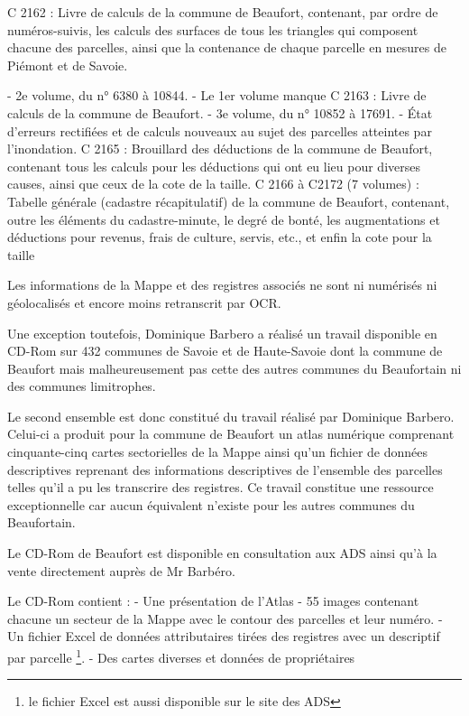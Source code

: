 \documentclass[12pt,a4paper]{report}
\begin{document}
C 2162 : Livre de calculs de la commune de Beaufort, contenant, par ordre de numéros-suivis, les calculs des surfaces de tous les triangles qui composent chacune des parcelles, ainsi que la contenance de chaque parcelle en mesures de Piémont et de Savoie.

- 2e volume, du n° 6380 à 10844. - Le 1er volume manque
C 2163 : Livre de calculs de la commune de Beaufort. - 3e volume, du n° 10852 à 17691. - État d’erreurs rectifiées et de calculs nouveaux au sujet des parcelles atteintes par l’inondation.
C 2165 : Brouillard des déductions de la commune de Beaufort, contenant tous les calculs pour les déductions qui ont eu lieu pour diverses causes, ainsi que ceux de la cote de la taille.
C 2166 à C2172 (7 volumes) : Tabelle générale (cadastre récapitulatif) de la commune de Beaufort, contenant, outre les éléments du cadastre-minute, le degré de bonté, les augmentations et déductions pour revenus, frais de culture, servis, etc., et enfin la cote pour la taille

\medskip

Les informations de la Mappe et des registres associés ne sont ni numérisés ni géolocalisés et encore moins retranscrit par OCR.

Une exception toutefois, Dominique Barbero  a réalisé un travail disponible en CD-Rom sur 432 communes de Savoie et de Haute-Savoie dont la commune de Beaufort mais malheureusement pas cette des autres communes du Beaufortain ni des communes limitrophes.

Le second ensemble est donc constitué du travail réalisé par Dominique Barbero. Celui-ci a produit pour la commune de Beaufort un atlas numérique comprenant cinquante-cinq cartes sectorielles de la Mappe ainsi qu'un fichier de données descriptives reprenant des informations descriptives de l'ensemble des parcelles telles qu'il a pu les transcrire des registres. Ce travail constitue une ressource exceptionnelle car aucun équivalent n'existe pour les autres communes du Beaufortain.

Le CD-Rom de Beaufort est disponible en consultation aux ADS ainsi qu’à la vente directement auprès de Mr Barbéro.

Le CD-Rom contient : 
-	Une présentation de l’Atlas
-	55 images contenant chacune un secteur de la Mappe avec le contour des parcelles et leur numéro.
-	Un fichier Excel de données attributaires tirées des registres avec un descriptif par parcelle \footnote{le fichier Excel est aussi disponible sur le site des ADS}.
-	Des cartes diverses et données de propriétaires 
\end{document}
